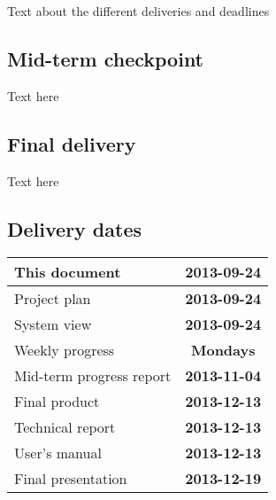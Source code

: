 Text about the different deliveries and deadlines


\subsection{Mid-term checkpoint}
Text here

\subsection{Final delivery}
Text here

\subsection{Delivery dates}
\label{sec:delivery_req}
\begin{center}
	\begin{Large}
	\begin{tabular}{|p{12.5cm}|c|}
		\hline
		\large{This document} & \large{\textbf{2013-09-24}} \\
		\hline
		\large{Project plan} & \large{\textbf{2013-09-24}} \\
		\hline
		\large{System view} & \large{\textbf{2013-09-24}} \\
		\hline
		\large{Weekly progress} & \large{\textbf{Mondays}} \\
		\hline
		\large{Mid-term progress report} & \large{\textbf{2013-11-04}} \\
		\hline
		\large{Final product} & \large{\textbf{2013-12-13}} \\
		\hline
		\large{Technical report} & \large{\textbf{2013-12-13}} \\
		\hline
		\large{User's manual} & \large{\textbf{2013-12-13}} \\
		\hline
		\large{Final presentation} & \large{\textbf{2013-12-19}} \\
		\hline	
		
	\end{tabular}
	\end{Large}
\end{center}